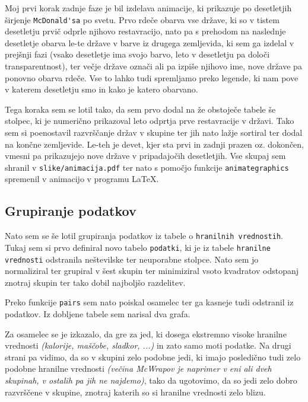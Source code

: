 \documentclass[hidelinks, 11pt,a4paper]{article}
\begin{document}
Moj prvi korak zadnje faze je bil izdelava animacije, ki prikazuje po desetletjih širjenje \verb|McDonald'sa| po svetu. Prvo rdeče obarva vse države, ki so v tistem desetletju prvič odprle njihovo restavracijo, nato pa s prehodom na naslednje desetletje obarva le-te države v barve iz drugega zemljevida, ki sem ga izdelal v prejšnji fazi (vsako desetletje ima svojo barvo, leto v desetletju pa določi transparentnost), ter večje države označi ali pa izpiše njihovo ime, nove države pa ponovno obarva rdeče. Vse to lahko tudi spremljamo preko legende, ki nam pove v katerem desetletju smo in kako je katero obarvano. \par
Tega koraka sem se lotil tako, da sem prvo dodal na že obstoječe tabele še stolpec, ki je numerično prikazoval leto odprtja prve restavracije v državi. Tako sem si poenostavil razvrščanje držav v skupine ter jih nato lažje sortiral ter dodal na končne zemljevide. Le-teh je devet, kjer sta prvi in zadnji prazen oz. dokončen, vmesni pa prikazujejo nove države v pripadajočih desetletjih. Vse skupaj sem shranil v \verb|slike/animacija.pdf| ter nato s pomočjo funkcije \verb|animategraphics| spremenil v animacijo v programu \LaTeX. \\[1em]

\subsection{Grupiranje podatkov}
Nato sem se še lotil grupiranja podatkov iz tabele o \verb|hranilnih vrednostih|. Tukaj sem si prvo definiral novo tabelo \verb|podatki|, ki je iz tabele \verb|hranilne| \verb|vrednosti| odstranila neštevilske ter neuporabne stolpce. Nato sem jo normaliziral ter grupiral v šest skupin ter minimiziral vsoto kvadratov odstopanj znotraj skupin ter tako dobil najboljšo razdelitev. \par
Preko funkcije \verb|pairs| sem nato poiskal osamelec ter ga kasneje tudi odstranil iz podatkov. Iz dobljene tabele sem narisal dva grafa. \par
Za osamelec se je izkazalo, da gre za jed, ki dosega ekstremno visoke hranilne vrednosti \textit{(kalorije, maščobe, sladkor, ...)} in zato samo moti podatke. Na drugi strani pa vidimo, da so v skupini zelo podobne jedi, ki imajo posledično tudi zelo podobne hranilne vrednosti \textit{(večina McWrapov je naprimer v eni ali dveh skupinah, v ostalih pa jih ne najdemo)}, tako da ugotovimo, da so jedi zelo dobro razvrščene v skupine, znotraj katerih so si hranilne vrednosti zelo blizu.
\end{document}
